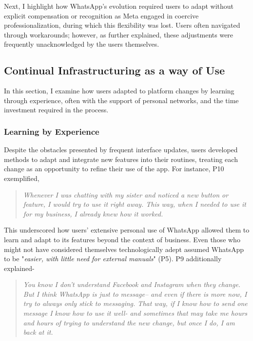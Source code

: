 Next, I highlight how WhatsApp's evolution required users to adapt without explicit compensation or recognition as Meta engaged in coercive professionalization, during which this flexibility was lost. Users often navigated through workarounds; however, as further explained, these adjustments were frequently unacknowledged by the users themselves.



\subsection{Continual Infrastructuring as a way of Use}
 
In this section, I examine how users adapted to platform changes by learning through experience, often with the support of personal networks, and the time investment required in the process.

\subsubsection{Learning by Experience}

Despite the obstacles presented by frequent interface updates, users developed methods to adapt and integrate new features into their routines, treating each change as an opportunity to refine their use of the app. For instance, P10 exemplified,

\begin{quote}
\textit{Whenever I was chatting with my sister and noticed a new button or feature, I would try to use it right away. This way, when I needed to use it for my business, I already knew how it worked.}
\end{quote}

This underscored how users’ extensive personal use of WhatsApp allowed them to learn and adapt to its features beyond the context of business. Even those who might not have considered themselves technologically adept assumed WhatsApp to be "\textit{easier, with little need for external manuals}" (P5). P9 additionally explained- 

\begin{quote}
    \textit{You know I don't understand Facebook and Instagram when they change. But I think WhatsApp is just to message-- and even if there is more now, I try to always only stick to messaging. That way, if I know how to send one message I know how to use it well- and sometimes that may take me hours and hours of trying to understand the new change, but once I do, I am back at it.}
\end{quote}


